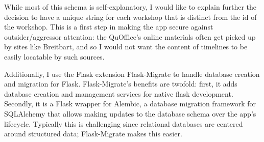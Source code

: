 \documentclass[12pt] {article}
\begin{document}

While most of this schema is self-explanatory, I would like to explain further the decision to have a unique string for each workshop that is distinct from the id of the workshop. This is a first step in making the app secure against outsider/aggressor attention: the QuOffice's online materials often get picked up by sites like Breitbart, and so I would not want the content of timelines to be easily locatable by such sources.

Additionally, I use the Flask extension Flask-Migrate to handle database creation and migration for Flask. Flask-Migrate's benefits are twofold: first, it adds database creation and management services for native flask development. Secondly, it is a Flask wrapper for Alembic, a database migration framework for SQLAlchemy that allows making updates to the database schema over the app's lifecycle. Typically this is challenging since relational databases are centered around structured data; Flask-Migrate makes this easier. 
\end{document}
